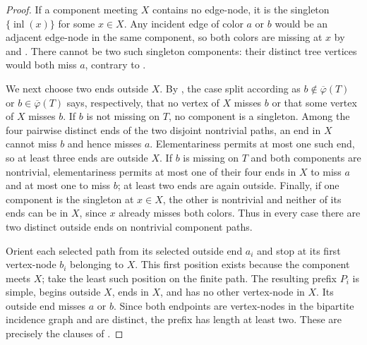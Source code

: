\begin{proof}
If a component meeting $X$ contains no edge-node, it is the singleton
$\{\operatorname{inl}(x)\}$ for some $x\in X$.  Any incident edge of
color $a$ or $b$ would be an adjacent edge-node in the same component,
so both colors are missing at $x$ by  and
.  There cannot be two such singleton components:
their distinct tree vertices would both miss $a$, contrary to
.

We next choose two ends outside $X$.  By , the
case split according as $b\notin\overline\varphi(T)$ or
$b\in\overline\varphi(T)$ says, respectively, that no vertex of $X$ misses
$b$ or that some vertex of $X$ misses $b$.  If $b$ is not missing on $T$, no
component is a singleton.  Among the four pairwise distinct ends of the
two disjoint nontrivial paths, an end in $X$ cannot miss $b$ and hence
misses $a$.  Elementariness permits at most one such end, so at least
three ends are outside $X$.  If $b$ is missing on $T$ and both components
are nontrivial, elementariness permits at most one of their four ends in
$X$ to miss $a$ and at most one to miss $b$; at least two ends are again
outside.  Finally, if one component is the singleton at $x\in X$, the
other is nontrivial and neither of its ends can be in $X$, since $x$
already misses both colors.  Thus in every case there are two distinct
outside ends on nontrivial component paths.

Orient each selected path from its selected outside end $a_i$ and stop
at its first vertex-node $b_i$ belonging to $X$.  This first position
exists because the component meets $X$; take the least such position on
the finite path.  The resulting prefix $P_i$ is simple, begins outside
$X$, ends in $X$, and has no other vertex-node in $X$.  Its outside end
misses $a$ or $b$.  Since both endpoints are vertex-nodes in the
bipartite incidence graph and are distinct, the prefix has length at
least two.  These are precisely the clauses of .


\end{proof}
